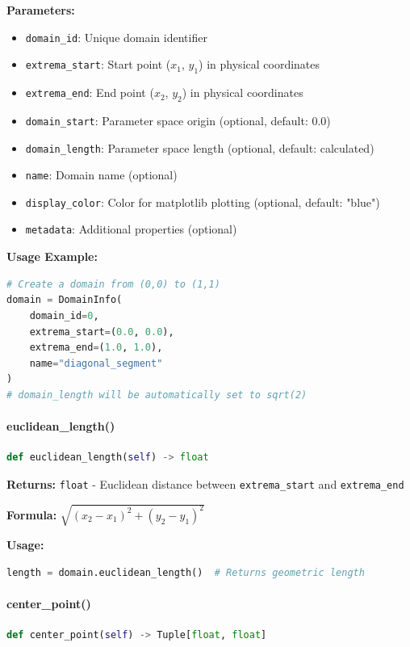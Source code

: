 \textbf{Parameters:}
\begin{itemize}
    \item \texttt{domain\_id}: Unique domain identifier
    \item \texttt{extrema\_start}: Start point ($x_1$, $y_1$) in physical coordinates
    \item \texttt{extrema\_end}: End point ($x_2$, $y_2$) in physical coordinates
    \item \texttt{domain\_start}: Parameter space origin (optional, default: 0.0)
    \item \texttt{domain\_length}: Parameter space length (optional, default: calculated)
    \item \texttt{name}: Domain name (optional)
    \item \texttt{display\_color}: Color for matplotlib plotting (optional, default: "blue")
    \item \texttt{metadata}: Additional properties (optional)
\end{itemize}

\textbf{Usage Example:}
\begin{lstlisting}[language=Python, caption=DomainInfo Usage]
# Create a domain from (0,0) to (1,1)
domain = DomainInfo(
    domain_id=0,
    extrema_start=(0.0, 0.0),
    extrema_end=(1.0, 1.0),
    name="diagonal_segment"
)
# domain_length will be automatically set to sqrt(2)
\end{lstlisting}

\paragraph{euclidean\_length()}\leavevmode
\begin{lstlisting}[language=Python, caption=Euclidean Length Calculation]
def euclidean_length(self) -> float
\end{lstlisting}

\textbf{Returns:} \texttt{float} - Euclidean distance between \texttt{extrema\_start} and \texttt{extrema\_end}

\textbf{Formula:} $\sqrt{(x_2-x_1)^2 + (y_2-y_1)^2}$

\textbf{Usage:}
\begin{lstlisting}[language=Python]
length = domain.euclidean_length()  # Returns geometric length
\end{lstlisting}

\paragraph{center\_point()}\leavevmode
\begin{lstlisting}[language=Python, caption=Center Point Calculation]
def center_point(self) -> Tuple[float, float]
\end{lstlisting}

